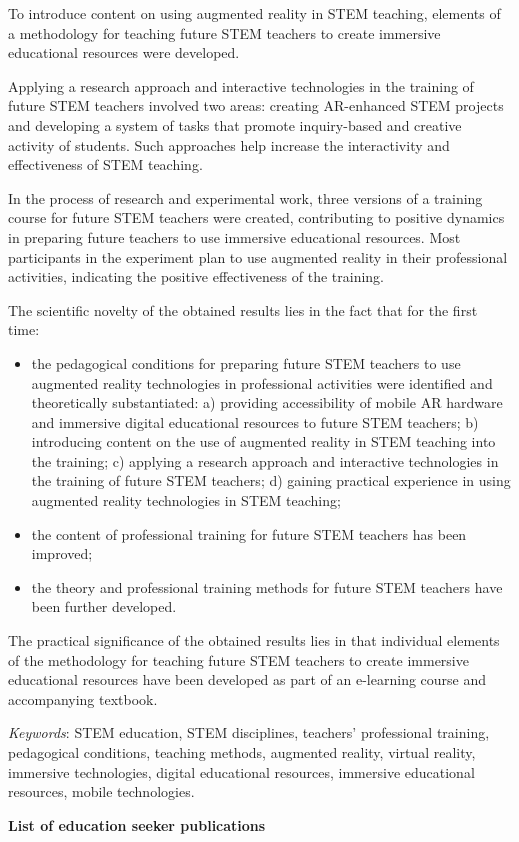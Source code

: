 {{To introduce content on using augmented reality in STEM teaching, elements of a methodology for teaching future STEM teachers to create immersive educational resources were developed. 

Applying a research approach and interactive technologies in the training of future STEM teachers involved two areas: creating AR-enhanced STEM projects and developing a system of tasks that promote inquiry-based and creative activity of students. Such approaches help increase the interactivity and effectiveness of STEM teaching.

In the process of research and experimental work, three versions of a training course for future STEM teachers were created, contributing to positive dynamics in preparing future teachers to use immersive educational resources. Most participants in the experiment plan to use augmented reality in their professional activities, indicating the positive effectiveness of the training.

The scientific novelty of the obtained results lies in the fact that for the first time:} 
\begin{itemize}
    \item 
{the pedagogical conditions for preparing future STEM teachers to use augmented reality technologies in professional activities were identified and theoretically substantiated: a) providing accessibility of mobile AR hardware and immersive digital educational resources to future STEM teachers; b) introducing content on the use of augmented reality in STEM teaching into the training; c) applying a research approach and interactive technologies in the training of future STEM teachers; d) gaining practical experience in using augmented reality technologies in STEM teaching;}
    \item 
{the content of professional training for future STEM teachers has been improved; }
    \item 
{the theory and professional training methods for future STEM teachers have been further developed.}
\end{itemize}

{The practical significance of the obtained results lies in that individual elements of the methodology for teaching future STEM teachers to create immersive educational resources have been developed as part of an e-learning course and accompanying textbook.

\textit{Keywords}: STEM education, STEM disciplines, teachers' professional training, pedagogical conditions, teaching methods, augmented reality, virtual reality, immersive technologies, digital educational resources, immersive educational resources, mobile technologies.}


\begin{center}
    \textbf{List of education seeker publications}
\end{center}


\printpratsi

} %
